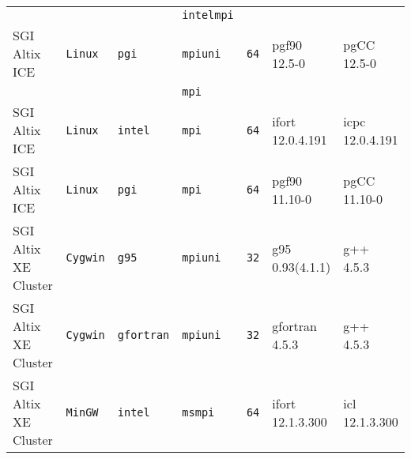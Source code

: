 \begin{longtable}{lllllll}
                      &           &                 &\tt intelmpi   &                    &                                    &                                 \\
SGI Altix ICE         &\tt Linux  &\tt pgi          &\tt mpiuni     &\tt 64              & pgf90 \footnotesize 12.5-0         & pgCC \footnotesize 12.5-0       \\ %
                      &           &                 &\tt mpi        &                    &                                    &                                 \\
SGI Altix ICE         &\tt Linux  &\tt intel        &\tt mpi        &\tt 64              & ifort \footnotesize 12.0.4.191     & icpc \footnotesize 12.0.4.191   \\ %
SGI Altix ICE         &\tt Linux  &\tt pgi          &\tt mpi        &\tt 64              & pgf90 \footnotesize 11.10-0        & pgCC \footnotesize 11.10-0      \\ %
SGI Altix XE Cluster  &\tt Cygwin &\tt g95          &\tt mpiuni     &\tt 32              & g95 \footnotesize 0.93(4.1.1)      & g++  \footnotesize 4.5.3        \\ %
SGI Altix XE Cluster  &\tt Cygwin &\tt gfortran     &\tt mpiuni     &\tt 32              & gfortran \footnotesize 4.5.3       & g++  \footnotesize 4.5.3        \\ %
SGI Altix XE Cluster  &\tt MinGW  &\tt intel        &\tt msmpi      &\tt 64              & ifort \footnotesize 12.1.3.300     & icl  \footnotesize 12.1.3.300   \\ %
\end{longtable}

\vspace{1ex}

